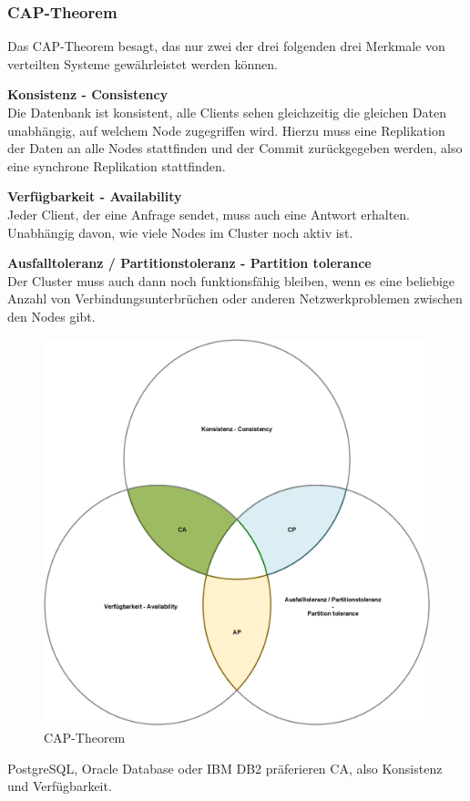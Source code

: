 
\subsubsection{CAP-Theorem}
Das CAP-Theorem besagt, das nur zwei der drei folgenden drei Merkmale von verteilten Systeme gewährleistet werden können\cite{EE6EQHU2}.
\begin{flushleft}
\textbf{Konsistenz - Consistency}\\
    Die Datenbank ist konsistent, alle Clients sehen gleichzeitig die gleichen Daten unabhängig, auf welchem Node zugegriffen wird.
    Hierzu muss eine Replikation der Daten an alle Nodes stattfinden und der Commit zurückgegeben werden, also eine synchrone Replikation stattfinden.
\end{flushleft}
\begin{flushleft}
\textbf{Verfügbarkeit - Availability}\\
    Jeder Client, der eine Anfrage sendet, muss auch eine Antwort erhalten.
    Unabhängig davon, wie viele Nodes im Cluster noch aktiv ist.
\end{flushleft}
\begin{flushleft}
\textbf{Ausfalltoleranz / Partitionstoleranz - Partition tolerance}\\
    Der Cluster muss auch dann noch funktionsfähig bleiben, wenn es eine beliebige Anzahl von Verbindungsunterbrüchen oder anderen Netzwerkproblemen zwischen den Nodes gibt.

\end{flushleft}
\begin{flushleft}
    \begin{figure}[H]
        \centering
        \includegraphics[width=0.5\linewidth]{source/implementation/evaluation/excursus_architecture/cap_theorem}
        \caption{CAP-Theorem}
        \label{fig:cap_theorem}
    \end{figure}

    \Gls{PostgreSQL}, \Gls{Oracle Database} oder \Gls{IBM DB2} präferieren CA, also Konsistenz und Verfügbarkeit.
\end{flushleft}